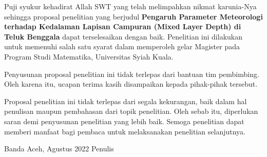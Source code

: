 \begin{spacing}{1.5}
	\pagestyle{empty}
	
	\vskip 1cm
	\par Puji syukur kehadirat Allah SWT yang telah melimpahkan nikmat karunia-Nya sehingga proposal penelitian yang berjudul \textbf{Pengaruh Parameter Meteorologi terhadap Kedalaman Lapisan Campuran (Mixed Layer Depth) di Teluk Benggala} dapat terselesaikan dengan baik. Penelitian ini dilakukan untuk memenuhi salah satu syarat dalam memperoleh gelar Magister pada Program Studi Matematika, Universitas Syiah Kuala.
	\par Penyusunan proposal penelitian ini tidak terlepas dari bantuan tim pembimbing. Oleh karena itu, ucapan terima  kasih disampaikan kepada pihak-pihak tersebut.
	\par Proposal penelitian ini tidak terlepas dari segala kekurangan, baik dalam hal penulisan maupun pembahasan dari topik penelitian. Oleh sebab itu, diperlukan saran demi penyusunan penelitian yang lebih baik. Semoga penelitian dapat memberi manfaat bagi pembaca untuk melaksanakan penelitian selanjutnya.
	\vskip 1cm  
	\begin{flushright}
		Banda Aceh, Agustus 2022
		\vskip 2cm
		Penulis	
	\end{flushright}
\end{spacing}
\pagestyle{empty}